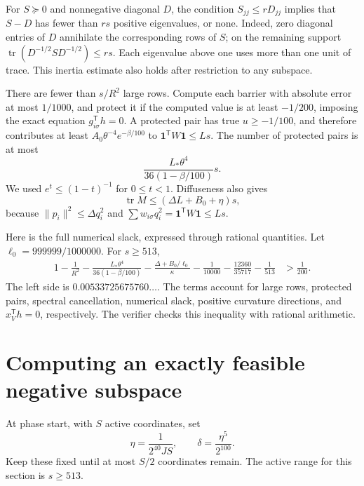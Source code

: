 \documentclass[11pt]{amsart}
\theoremstyle{remark}\newtheorem{remark}[theorem]{Remark}
\newcommand{\tr}{\operatorname{tr}}
\newcommand{\one}{\mathbf 1}
\newcommand{\T}{\mathsf T}
\begin{document}
For $S\succeq0$ and nonnegative diagonal $D$, the condition
$S_{jj}\le rD_{jj}$ implies that $S-D$ has fewer than $rs$ positive
eigenvalues, or none. Indeed, zero diagonal entries of $D$ annihilate the
corresponding rows of $S$; on the remaining support
$\tr(D^{-1/2}SD^{-1/2})\le rs$. Each eigenvalue above one uses more than
one unit of trace. This inertia estimate also holds after restriction to
any subspace.

There are fewer than $s/R^2$ large rows. Compute each barrier with absolute
error at most $1/1000$, and protect it if the computed value is at least
$-1/200$, imposing the exact equation $g_{i\sigma}^\T h=0$.
A protected pair has true $u\ge-1/100$, and therefore contributes at least
$A_0\theta^{-4}e^{-\beta/100}$ to $\one^\T W\one\le Ls$.
The number of protected pairs is at most
\begin{equation}\label{eq:protectedcount}
 \frac{L_*\theta^4}{36(1-\beta/100)}s.
\end{equation}
We used $e^t\le(1-t)^{-1}$ for $0\le t<1$.
Diffuseness also gives
\begin{equation}\label{eq:trace}
 \tr M\le(\Delta L+B_0+\eta)s,
\end{equation}
because $\|p_i\|^2\le\Delta q_i^2$ and
$\sum w_{i\sigma}q_i^2=\one^\T W\one\le Ls$.

Here is the full numerical slack, expressed through rational quantities.
Let $\ell_0=999999/1000000$. For $s\ge513$,
\begin{align}\label{eq:dimensioncertificate}
 1-\frac1{R^2}
 -\frac{L_*\theta^4}{36(1-\beta/100)}
 -\frac{\Delta+B_0/\ell_0}{\kappa}
 -\frac1{10000}
 -\frac{12360}{35717}-\frac1{513}
 &>\frac1{200}.
\end{align}
The left side is $0.00533725675760\ldots$.
The terms account for large rows, protected pairs, spectral cancellation,
numerical slack, positive curvature directions, and $x_V^\T h=0$,
respectively. The verifier checks this inequality with rational arithmetic.

\section{Computing an exactly feasible negative subspace}\label{sec:finite}

At phase start, with $S$ active coordinates, set
\begin{equation}\label{eq:precision}
 \eta=\frac1{2^{40}JS},\qquad \delta=\frac{\eta^5}{2^{100}}.
\end{equation}
Keep these fixed until at most $S/2$ coordinates remain. The active range
for this section is $s\ge513$.
\end{document}
